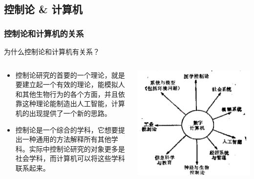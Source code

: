 \documentclass[12pt,AutoFakeBold,aspectratio=43,mathserif]{beamer}
\begin{document}
    \subsection{控制论 \& 计算机}
    \begin{frame}
        \frametitle{控制论和计算机的关系}
        \begin{block}{\textnormal{为什么控制论和计算机有关系？}} \end{block} \pause
        \begin{columns}
            \begin{column}{.5\linewidth}
                \begin{itemize}
                    \item  \footnotesize 控制论研究的首要的一个理论，就是要建立起一个有效的理论，能模拟人和其他生物行为的各个方面，并且依靠这种理论能制造出人工智能，计算机的出现提供了一个新的思路。 \pause
                    \item  \footnotesize 控制论是一个综合的学科，它想要提出一种通用的方法解释所有其他学科。实际中控制论研究的对象更多是社会学科，而计算机可以将这些学科联系起来。 
                \end{itemize}
            \end{column}
            \begin{column}{.5\linewidth}
                \includegraphics[width=.4\paperwidth]{figures/3-3.jpg}
            \end{column}
        \end{columns}
        
    \end{frame}
\end{document}
